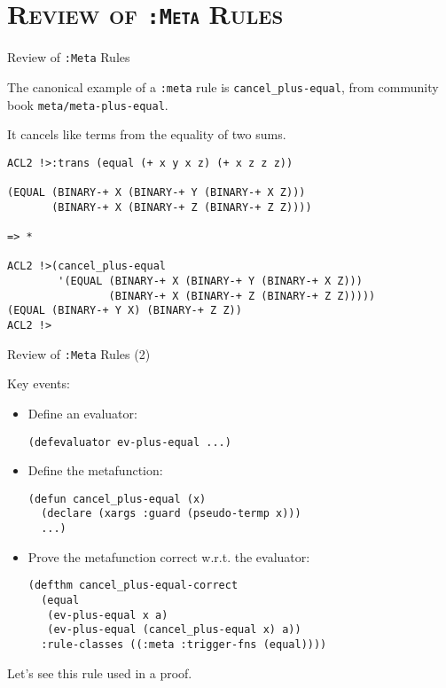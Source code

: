 \section[\scshape Review]{\scshape Review of {\tt :Meta} Rules}
\begin{frame}[fragile]{Review of {\tt :Meta} Rules}

The canonical example of a {\tt :meta} rule is
\verb|cancel_plus-equal|, from
community book {\tt meta/meta-plus-equal}.

It cancels like terms from the equality of two sums.

{\footnotesize
\begin{verbatim}
ACL2 !>:trans (equal (+ x y x z) (+ x z z z))

(EQUAL (BINARY-+ X (BINARY-+ Y (BINARY-+ X Z)))
       (BINARY-+ X (BINARY-+ Z (BINARY-+ Z Z))))

=> *

ACL2 !>(cancel_plus-equal
        '(EQUAL (BINARY-+ X (BINARY-+ Y (BINARY-+ X Z)))
                (BINARY-+ X (BINARY-+ Z (BINARY-+ Z Z)))))
(EQUAL (BINARY-+ Y X) (BINARY-+ Z Z))
ACL2 !>
\end{verbatim}
}

\end{frame}
\begin{frame}[fragile]{Review of {\tt :Meta} Rules (2)}

Key events:
\begin{itemize}
\item Define an evaluator:
\begin{verbatim}
(defevaluator ev-plus-equal ...)
\end{verbatim}
  
\item Define the metafunction:
\begin{verbatim}
(defun cancel_plus-equal (x)
  (declare (xargs :guard (pseudo-termp x)))
  ...)
\end{verbatim}

\item Prove the metafunction correct w.r.t. the evaluator:
\begin{verbatim}
(defthm cancel_plus-equal-correct
  (equal
   (ev-plus-equal x a)
   (ev-plus-equal (cancel_plus-equal x) a))
  :rule-classes ((:meta :trigger-fns (equal))))
\end{verbatim}
\end{itemize}
Let's see this rule used in a proof.

\end{frame}
